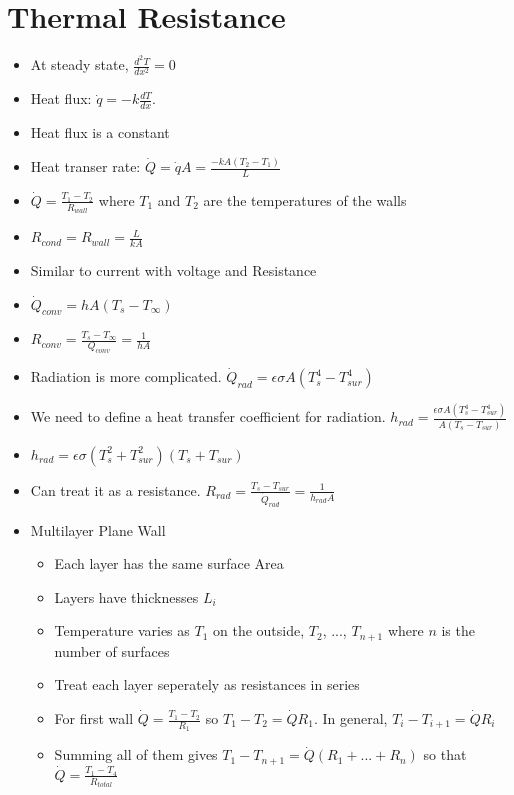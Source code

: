 \documentclass[12pt]{article}
\begin{document}
\section{Thermal Resistance}
\begin{itemize}
    \item At steady state, $\frac{d^2T}{dx^2} = 0$
    \item Heat flux: $\dot{q} = -k \frac{dT}{dx}$. 
    \item Heat flux is a constant
    \item Heat transer rate: $\dot{Q} = \dot{q} A = \frac{-kA(T_2-T_1)}{L}$
    \item $\dot{Q} = \frac{T_1 - T_2}{R_{wall}}$ where $T_1$ and $T_2$ are the temperatures of the walls
    \item $R_{cond} = R_{wall} = \frac{L}{kA}$
    \item Similar to current with voltage and Resistance
    \item $\dot{Q}_{conv} = hA (T_s - T_{\infty})$
    \item $R_{conv} = \frac{T_s-T_{\infty}}{Q_{conv}} = \frac{1}{hA}$
    \item Radiation is more complicated. $\dot{Q}_{rad} = \epsilon \sigma A(T_s^4 - T_{sur}^4)$
    \item We need to define a heat transfer coefficient for radiation. $h_{rad} = \frac{\epsilon \sigma A(T_s^4 - T_{sur}^4)}{A(T_s - T_{sur})}$
    \item $h_{rad} = \epsilon \sigma (T_s^2 + T_{sur}^2)(T_s + T_{sur})$
    \item Can treat it as a resistance. $R_{rad} = \frac{T_s - T_{sur}}{\dot{Q}_{rad}} = \frac{1}{h_{rad}A}$
    \item Multilayer Plane Wall \begin{itemize}
        \item Each layer has the same surface Area
        \item Layers have thicknesses $L_i$
        \item Temperature varies as $T_1$ on the outside, $T_2$, ..., $T_{n+1}$ where $n$ is the number of surfaces
        \item Treat each layer seperately as resistances in series
        \item For first wall $\dot{Q} = \frac{T_1-T_2}{R_1}$ so $T_1 - T_2 = \dot{Q}R_1$. In general, $T_i - T_{i+1} = \dot{Q}R_i$
        \item Summing all of them gives $T_1 - T_{n+1} = \dot{Q}(R_1 + ... + R_n)$ so that $\dot{Q} = \frac{T_1 - T_4}{R_{total}}$

\end{itemize}
\end{itemize}
\end{document}
